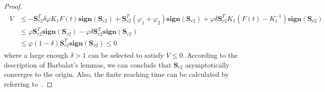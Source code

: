 \documentclass[3p]{elsarticle}
\theoremstyle{plain}
\theoremstyle{remark}
\begin{document}
\begin{proof}
\begin{align}
\begin{split}
\dot V&\le -\bm S_{r2}^T\delta\varphi  K_1F(t)\mathbf{sign}(\bm S_{r2})+\bm S_{r2}^T(\varphi_1+\varphi_2) \mathbf{sign}(\bm S_{r2})+\varphi\delta \bm S_{r2}^T K_1(F(t)-K_1^{-1})\mathbf{sign}(\bm S_{r2})\\
&\le \varphi \bm S_{r2}^T\mathbf{sign}(\bm S_{r2})-\varphi\delta \bm S_{r2}^T \mathbf{sign}(\bm S_{r2})\\
&\le\varphi(1-\delta)\bm S_{r2}^T\mathbf{sign}(\bm S_{r2})\le 0
\end{split}
\end{align}
where a large enough $\delta>1$ can be selected to satisfy $\dot V \le 0$. According to the description of Barbalat's lemmas, we can conclude  that $\bm S_{r2}$ asymptotically converges to the origin. Also, the finite reaching time can be calculated by referring to~\cite{Ma201667}.


\end{proof}
\end{document}
